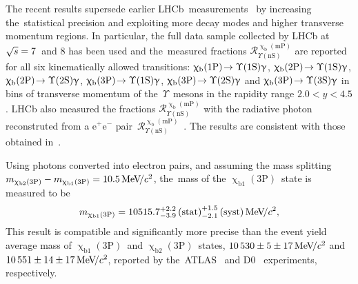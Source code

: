 \documentclass[a4paper]{article}
\def\lhcb {\mbox{LHCb}\xspace}
\def\atlas  {\mbox{ATLAS}\xspace}
\def\Pgamma      {\ensuremath{\upgamma}\xspace}
\def\Pchi        {\ensuremath{\upchi}\xspace}
\def\PUpsilon      {\ensuremath{\Upsilon}\xspace}
\def\Pa      {\ensuremath{\mathrm{a}}\xspace}
\def\Pb      {\ensuremath{\mathrm{b}}\xspace}
\def\Pe      {\ensuremath{\mathrm{e}}\xspace}
\def\epem       {{\ensuremath{\Pe^+\Pe^-}}\xspace}
\def\g      {{\ensuremath{\Pgamma}}\xspace}
\def\bquark    {{\ensuremath{\Pb}}\xspace}
\def\Y#1S{\ensuremath{\PUpsilon\mathrm{(#1S)}}\xspace}%
\newcommand{\decay}[2]{\ensuremath{#1\!\to #2}\xspace}         %
\def\to                 {\ensuremath{\rightarrow}\xspace}
\newcommand{\tev}{\ifthenelse{\boolean{inbibliography}}{\ensuremath{~T\kern -0.05em eV}\xspace}{\ensuremath{\mathrm{\,Te\kern -0.1em V}}}\xspace}
\newcommand{\mevcc}{\ensuremath{{\mathrm{\,Me\kern -0.1em V\!/}c^2}}\xspace}
\newcommand{\stat}{\ensuremath{\mathrm{\,(stat)}}\xspace}
\newcommand{\syst}{\ensuremath{\mathrm{\,(syst)}}\xspace}
\def\sqs   {\ensuremath{\protect\sqrt{s}}\xspace}
\def\chiboneThreeP  {\ensuremath{\Pchi_{\bquark 1}\mathrm{(3P)}}\xspace}
\def\chibtwoThreeP  {\ensuremath{\Pchi_{\bquark 2}\mathrm{(3P)}}\xspace}
\def\ups            {\ensuremath{\PUpsilon}\xspace}
\def\YnS            {\ensuremath{\PUpsilon\mathrm{(nS)}}\xspace}%
\def\chibonep       {\ensuremath{\Pchi_{\bquark}\mathrm{(1P)}}\xspace}
\def\chibtwop       {\ensuremath{\Pchi_{\bquark}\mathrm{(2P)}}\xspace}
\def\chibthreep     {\ensuremath{\Pchi_{\bquark}\mathrm{(3P)}}\xspace}
\def\chibmp         {\ensuremath{\Pchi_{\bquark}\mathrm{(mP)}}\xspace}
\begin{document}
The recent results supersede earlier \lhcb~measurements~\cite{LHCb-PAPER-2012-015,LHCb-CONF-2012-020}
by increasing the~statistical precision and exploiting more decay modes and higher transverse 
momentum regions.
In particular, the full data sample collected by \lhcb at \mbox{$\sqs=7$}~and 8\tev has been used and
the~measured fractions $\mathcal{R}^{\chibmp}_{\YnS}$
are reported for all six kinematically allowed transitions:
\mbox{\decay{\chibonep}{\Y1S\g}},
\mbox{\decay{\chibtwop}{\Y1S\g}},
\mbox{\decay{\chibtwop}{\Y2S\g}},
\mbox{\decay{\chibthreep}{\Y1S\g}},
\mbox{\decay{\chibthreep}{\Y2S\g}} and 
\mbox{\decay{\chibthreep}{\Y3S\g}}
in bins of transverse momentum of the~\ups~mesons in the rapidity range  $2.0<y<4.5$.
\lhcb also measured the fractions $\mathcal{R}^{\chibmp}_{\YnS}$ with the radiative photon reconstruted from a $\epem$ pair~$\mathcal{R}^{\chibmp}_{\YnS}$~\cite{Aaij:1753641}. The results are consistent with those obtained in~\cite{Aaij:1746553}.

Using photons converted into electron pairs, and assuming the mass splitting $m_{\chibtwoThreeP}-m_{\chiboneThreeP}=10.5\mevcc$,
the~mass of the \chiboneThreeP~state is measured to be 
\begin{equation*} 
m_{\chiboneThreeP} = 10515.7^{+2.2}_{-3.9}\stat ^{+1.5}_{-2.1}\syst \mevcc,
\end{equation*}
This result \cite{Aaij:1753641} is compatible and significantly more precise than 
the event yield average mass of
\chiboneThreeP~and
\chibtwoThreeP~states,
\mbox{$10\,530 \pm 5\pm 17\mevcc$} and 
\mbox{$10\,551 \pm 14\pm 17\mevcc$}, 
reported by the~\atlas~\cite{Aad:2011ih}
and D0~\cite{Abazov:2012gh} experiments, respectively.
\end{document}
